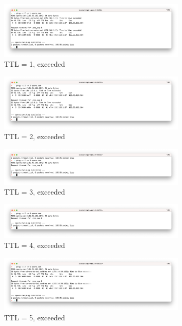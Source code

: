 \documentclass[a4paper]{article}
\begin{document}
  
  \begin{figure}[H]
    \centering
    \includegraphics[width=0.8\textwidth]{s213}
    \caption{TTL = 1, exceeded}
  \end{figure}
  \begin{figure}[H]
    \centering
    \includegraphics[width=0.8\textwidth]{s214}
    \caption{TTL = 2, exceeded}
  \end{figure}
  \begin{figure}[H]
    \centering
    \includegraphics[width=0.8\textwidth]{s215}
    \caption{TTL = 3, exceeded}
  \end{figure}
  \begin{figure}[H]
    \centering
    \includegraphics[width=0.8\textwidth]{s216}
    \caption{TTL = 4, exceeded}
  \end{figure}
  \begin{figure}[H]
    \centering
    \includegraphics[width=0.8\textwidth]{s217}
    \caption{TTL = 5, exceeded}
  \end{figure}
\end{document}
